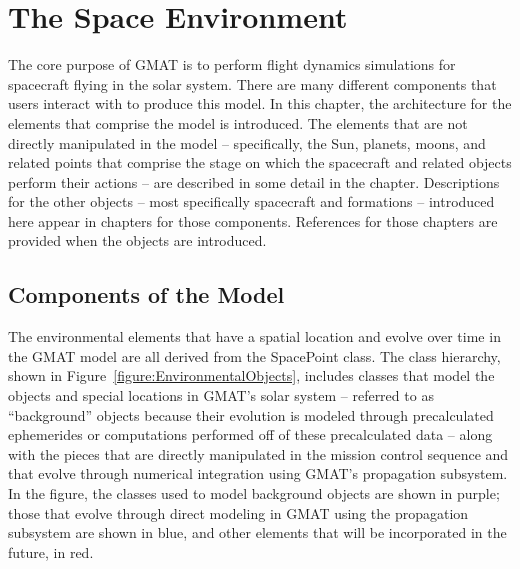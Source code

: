 \chapter{\label{chapter:SolarSystem}The Space Environment}

The core purpose of GMAT is to perform flight dynamics simulations for spacecraft flying in the
solar system.  There are many different components that users interact with to produce this model.
In this chapter, the architecture for the elements that comprise the model is introduced.  The
elements that are not directly manipulated in the model -- specifically, the Sun, planets, moons,
and related points that comprise the stage on which the spacecraft and related objects perform
their actions -- are described in some detail in the chapter.  Descriptions for the other objects
-- most specifically spacecraft and formations -- introduced here appear in chapters for those
components.  References for those chapters are provided when the objects are introduced.

\section{Components of the Model}

The environmental elements that have a spatial location and evolve over time in the GMAT model are
all derived from the SpacePoint class.  The class hierarchy, shown in
Figure~\ref{figure:EnvironmentalObjects}, includes classes that model the objects and
special locations in GMAT's solar system -- referred to as ``background'' objects because their
evolution is modeled through precalculated ephemerides or computations performed off of these
precalculated data -- along with the pieces that are directly manipulated in the mission control
sequence and that evolve through numerical integration using GMAT's propagation subsystem.  In the
figure, the classes used to model background objects are shown in purple; those that evolve through
direct modeling in GMAT using the propagation subsystem are shown in blue, and other elements that
will be incorporated in the future, in red.

